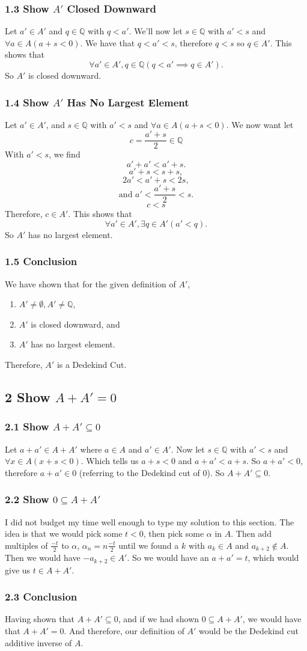 \documentclass[12pt]{article}
\newcommand{\Q}{\mathbb{Q}}
\begin{document}
\subsubsection*{1.3 Show $A'$ Closed Downward}
Let $a'\in A'$ and $q\in\Q$ with $q<a'$. We'll now let $s\in\Q$ with $a'<s$ and $\forall a\in A(a+s<0)$. We have that $q<a'<s$, therefore $q<s$ so $q\in A'$. This shows that
\[\forall a'\in A', q\in\Q(q<a' \implies q\in A').\]
So $A'$ is closed downward.

\subsubsection*{1.4 Show $A'$ Has No Largest Element}
Let $a'\in A'$, and $s\in\Q$ with $a'<s$ and $\forall a\in A(a+s<0)$. We now want let
\[c=\frac{a'+s}{2} \in\Q\]
With $a'<s$, we find
\[a'+a'<a'+s.\]
\[a'+s<s+s,\]
\[2a' < a'+s < 2s,\]
\[\text{and } a' < \frac{a'+s}{2} < s.\]
\[c<s\]
Therefore, $c\in A'$. This shows that
\[\forall a'\in A',\exists q\in A'(a'<q).\]
So $A'$ has no largest element.

\subsubsection*{1.5 Conclusion}
We have shown that for the given definition of $A'$,
\begin{enumerate}
    \item $A'\ne \emptyset, A'\ne\Q$,
    \item $A'$ is closed downward, and
    \item $A'$ has no largest element.
\end{enumerate}

Therefore, $A'$ is a Dedekind Cut.

\subsection*{2 Show $A+A'=0$}
\subsubsection*{2.1 Show $A+A'\subseteq 0$}
Let $a+a'\in A+A'$ where $a\in A$ and $a'\in A'$. Now let $s\in\Q$ with $a'<s$ and $\forall x\in A(x+s<0)$. Which tells us $a+s<0$ and $a+a'<a+s$. So $a+a'<0$, therefore $a+a'\in 0$ (referring to the Dedekind cut of 0). So $A+A'\subseteq 0$.

\subsubsection*{2.2 Show $0 \subseteq A+A'$}
I did not budget my time well enough to type my solution to this section. The idea is that we would pick some $t<0$, then pick some $\alpha$ in $A$. Then add multiples of $\frac{-t}{2}$ to $\alpha$, $\alpha_n = n\frac{-t}{2}$ until we found a $k$ with $a_k\in A$ and $a_{k+2}\notin A$. Then we would have $-a_{k+2}\in A'$. So we would have an $a+a'=t$, which would give us $t\in A+A'$.

\subsubsection{2.3 Conclusion}
Having shown that $A+A'\subseteq 0$, and if we had shown $0 \subseteq A+A'$, we would have that $A+A'=0$. And therefore, our definition of $A'$ would be the Dedekind cut additive inverse of $A$.
\end{document}
